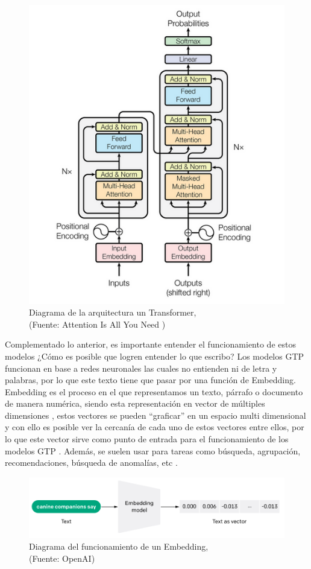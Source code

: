 \begin{figure}[ht!]
    \centering
    \includegraphics[width=.5\textwidth]{figures/ea3.png}
    \caption[Diagrama de la arquitectura un Transformer]{Diagrama de la arquitectura un Transformer,\\
    {\scriptsize (Fuente: Attention Is All You Need \cite{aiayn})}}
    \label{fig:ea4}
\end{figure}

\newpage

Complementado lo anterior, es importante entender el funcionamiento de estos modelos ¿Cómo es posible que logren entender lo que escribo? Los modelos 
GTP funcionan en base a redes neuronales las cuales no entienden ni de letra y palabras, por lo que este texto tiene que pasar por
una función de Embedding. Embedding es el proceso en el que representamos un texto, párrafo o documento de manera numérica, siendo
esta representación en vector de múltiples dimensiones \cite{eb1}, estos vectores se pueden ``graficar'' en un espacio multi dimensional y con 
ello es posible ver la cercanía de cada uno de estos vectores entre ellos, por lo que este vector sirve como punto de entrada para
el funcionamiento de los modelos GTP \cite{eb2}. Además, se suelen usar para tareas como búsqueda, agrupación, recomendaciones, 
búsqueda de anomalías, etc \cite{eb3}.

\begin{figure}[ht!]
    \centering
    \includegraphics[width=.8\textwidth]{figures/huemul4.png}
    \caption[Diagrama del funcionamiento de un Embedding]{Diagrama del funcionamiento de un Embedding,\\
    {\scriptsize (Fuente: OpenAI\cite{openai1})}}
    \label{fig:ea5}
\end{figure}

